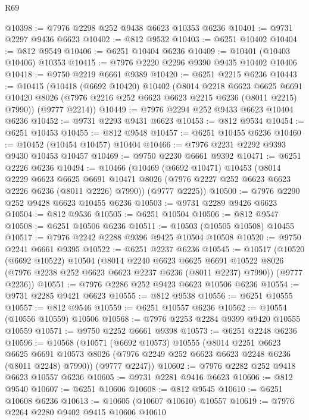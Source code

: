 \begin{lexlean}{R69}
\begin{coremodule}
{@10398 := @7976 @2298 @252 @9438 @6623 @10353 @6236
@10401 := @9731 @2297 @9436 @6623
@10402 := @812 @9532
@10403 := @6251 @10402
@10404 := @812 @9549
@10406 := @6251 @10404 @6236
@10409 := @10401 (@10403 @10406) @10353
@10415 := @7976 @2220 @2296 @9390 @9435 @10402 @10406
@10418 := @9750 @2219 @6661 @9389
@10420 := @6251 @2215 @6236
@10443 := @10415
    (@10418
      (@6692 @10420)
      @10402
      (@8014
        @2218
        @6623
        @6625
        @6691
        @10420
        @8026
        (@7976 @2216 @252 @6623 @6623 @2215 @6236 (@8011 @2215) @7990))
      (@9777 @2214))
@10449 := @7976 @2294 @252 @9433 @6623 @10404 @6236
@10452 := @9731 @2293 @9431 @6623
@10453 := @812 @9534
@10454 := @6251 @10453
@10455 := @812 @9548
@10457 := @6251 @10455 @6236
@10460 := @10452 (@10454 @10457) @10404
@10466 := @7976 @2231 @2292 @9393 @9430 @10453 @10457
@10469 := @9750 @2230 @6661 @9392
@10471 := @6251 @2226 @6236
@10494 := @10466
    (@10469
      (@6692 @10471)
      @10453
      (@8014
        @2229
        @6623
        @6625
        @6691
        @10471
        @8026
        (@7976 @2227 @252 @6623 @6623 @2226 @6236 (@8011 @2226) @7990))
      (@9777 @2225))
@10500 := @7976 @2290 @252 @9428 @6623 @10455 @6236
@10503 := @9731 @2289 @9426 @6623
@10504 := @812 @9536
@10505 := @6251 @10504
@10506 := @812 @9547
@10508 := @6251 @10506 @6236
@10511 := @10503 (@10505 @10508) @10455
@10517 := @7976 @2242 @2288 @9396 @9425 @10504 @10508
@10520 := @9750 @2241 @6661 @9395
@10522 := @6251 @2237 @6236
@10545 := @10517
    (@10520
      (@6692 @10522)
      @10504
      (@8014
        @2240
        @6623
        @6625
        @6691
        @10522
        @8026
        (@7976 @2238 @252 @6623 @6623 @2237 @6236 (@8011 @2237) @7990))
      (@9777 @2236))
@10551 := @7976 @2286 @252 @9423 @6623 @10506 @6236
@10554 := @9731 @2285 @9421 @6623
@10555 := @812 @9538
@10556 := @6251 @10555
@10557 := @812 @9546
@10559 := @6251 @10557 @6236
@10562 := @10554 (@10556 @10559) @10506
@10568 := @7976 @2253 @2284 @9399 @9420 @10555 @10559
@10571 := @9750 @2252 @6661 @9398
@10573 := @6251 @2248 @6236
@10596 := @10568
    (@10571
      (@6692 @10573)
      @10555
      (@8014
        @2251
        @6623
        @6625
        @6691
        @10573
        @8026
        (@7976 @2249 @252 @6623 @6623 @2248 @6236 (@8011 @2248) @7990))
      (@9777 @2247))
@10602 := @7976 @2282 @252 @9418 @6623 @10557 @6236
@10605 := @9731 @2281 @9416 @6623
@10606 := @812 @9540
@10607 := @6251 @10606
@10608 := @812 @9545
@10610 := @6251 @10608 @6236
@10613 := @10605 (@10607 @10610) @10557
@10619 := @7976 @2264 @2280 @9402 @9415 @10606 @10610
}
\end{coremodule}
\end{lexlean}
